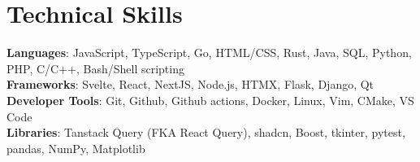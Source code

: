 \documentclass[letterpaper,11pt]{article}
\begin{document}
%
\section{Technical Skills}
 \begin{itemize}[leftmargin=0.15in, label={}]
    \small{\item{
     \textbf{Languages}{: JavaScript, TypeScript, Go, HTML/CSS, Rust, Java, SQL, Python, PHP, C/C++, Bash/Shell scripting} \\
     \textbf{Frameworks}{: Svelte, React, NextJS, Node.js, HTMX, Flask, Django, Qt} \\
     \textbf{Developer Tools}{: Git, Github, Github actions, Docker, Linux, Vim, CMake, VS Code} \\
     \textbf{Libraries}{: Tanstack Query (FKA React Query), shadcn, Boost, tkinter, pytest, pandas, NumPy, Matplotlib}
    }}
 \end{itemize}


\end{document}
